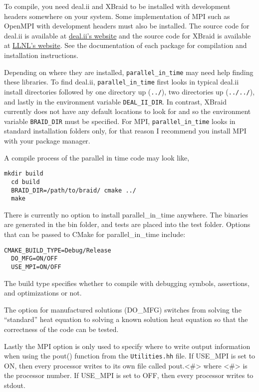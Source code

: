 \documentclass{article}
\begin{document}
To compile, you need deal.ii and XBraid to be installed with development headers somewhere on your system.
Some implementation of MPI such as OpenMPI with development headers must also be installed.
The source code for deal.ii is available at \href{https://dealii.org/}{deal.ii's website} and the source code for XBraid is available at \href{https://computation.llnl.gov/projects/parallel-time-integration-multigrid}{LLNL's website}.
See the documentation of each package for compilation and installation instructions.

Depending on where they are installed, \texttt{parallel\_in\_time} may need help finding these libraries.
To find deal.ii, \texttt{parallel\_in\_time} first looks in typical deal.ii install directories followed by one directory up (\texttt{../}), two directories up (\texttt{../../}), and lastly in the environment variable \texttt{DEAL\_II\_DIR}.
In contrast, XBraid currently does not have any default locations to look for and so the environment variable \texttt{BRAID\_DIR} must be specified.
For MPI, \texttt{parallel\_in\_time} looks in standard installation folders only, for that reason I recommend you install MPI with your package manager.

A compile process of the parallel in time code may look like,
\begin{lstlisting}[frame=single]
  mkdir build
  cd build
  BRAID_DIR=/path/to/braid/ cmake ../
  make
\end{lstlisting}

There is currently no option to install parallel\_in\_time anywhere.
The binaries are generated in the bin folder, and tests are placed into the test folder.
Options that can be passed to CMake for parallel\_in\_time include:
\begin{lstlisting}[frame=single]
  CMAKE_BUILD_TYPE=Debug/Release
  DO_MFG=ON/OFF
  USE_MPI=ON/OFF
\end{lstlisting}
The build type specifies whether to compile with debugging symbols,
assertions, and optimizations or not.

The option for manufactured solutions (DO\_MFG) switches from solving the ``standard'' heat equation to solving a known solution heat equation so that the correctness of the code can be tested.

Lastly the MPI option is only used to specify where to write output information when using the pout() function from the \texttt{Utilities.hh} file.
If USE\_MPI is set to ON, then every processor writes to its own file called pout.\textless{}\#\textgreater{} where \textless{}\#\textgreater{} is the processor number.
If USE\_MPI is set to OFF, then every processor writes to stdout.
\end{document}
